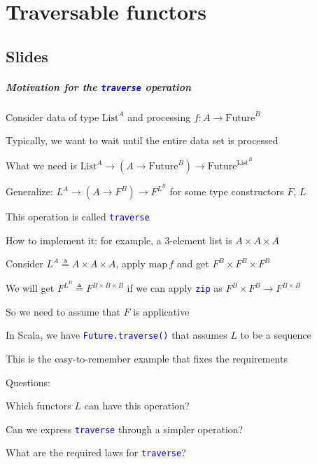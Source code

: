 
\chapter{Traversable functors\label{chap:9-Traversable-functors-and}}

\section{Slides}

\paragraph{Motivation for the \texttt{\textcolor{blue}{\footnotesize{}traverse}}
operation}

Consider data of type $\text{List}^{A}$ and processing $f:A\rightarrow\text{Future}^{B}$

Typically, we want to wait until the entire data set is processed

What we need is $\text{List}^{A}\rightarrow\left(A\rightarrow\text{Future}^{B}\right)\rightarrow\text{Future}^{\text{List}^{B}}$

Generalize: $L^{A}\rightarrow\left(A\rightarrow F^{B}\right)\rightarrow F^{L^{B}}$
for some type constructors $F$, $L$

This operation is called \texttt{\textcolor{blue}{\footnotesize{}traverse}} 

How to implement it: for example, a 3-element list is $A\times A\times A$

Consider $L^{A}\triangleq A\times A\times A$, apply $\text{map}\,f$
and get $F^{B}\times F^{B}\times F^{B}$

We will get $F^{L^{B}}\triangleq F^{B\times B\times B}$ if we can
apply \texttt{\textcolor{blue}{\footnotesize{}zip}} as $F^{B}\times F^{B}\rightarrow F^{B\times B}$

So we need to assume that $F$ is applicative

In Scala, we have \texttt{\textcolor{blue}{\footnotesize{}Future.traverse()}}
that assumes $L$ to be a sequence

This is the easy-to-remember example that fixes the requirements

Questions:

Which functors $L$ can have this operation?

Can we express \texttt{\textcolor{blue}{\footnotesize{}traverse}}
through a simpler operation?

What are the required laws for \texttt{\textcolor{blue}{\footnotesize{}traverse}}?

